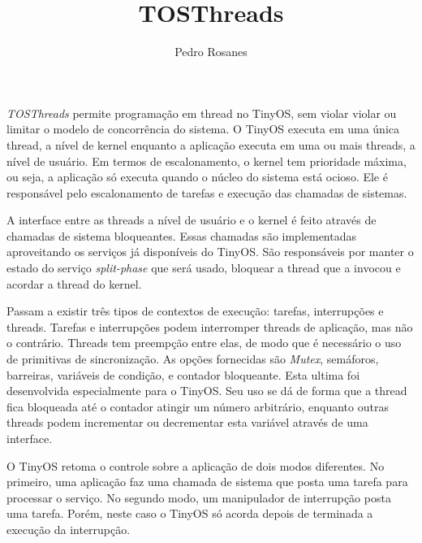\documentclass[a4paper,onecolumn, 10pt]{article}
\title{TOSThreads}
\author{Pedro Rosanes}
\begin{document}
\maketitle





\textit{TOSThreads} permite programação em thread no TinyOS, sem violar violar ou limitar o modelo de concorrência do
sistema. O TinyOS executa em uma única thread, a nível de kernel enquanto a aplicação executa em uma ou mais threads, a nível de usuário.
Em termos de escalonamento, o kernel tem prioridade máxima, ou seja, a aplicação só executa quando o núcleo do sistema
está ocioso. Ele é responsável pelo escalonamento de tarefas e execução das chamadas de sistemas. 

A interface entre as threads a nível de usuário e o kernel é feito através de chamadas de sistema bloqueantes. Essas
chamadas são implementadas aproveitando os serviços já disponíveis do TinyOS. São responsáveis por manter o estado do serviço 
\textit{split-phase} que será usado, bloquear a thread que a invocou e acordar a thread do kernel.

Passam a existir três tipos de contextos de execução: tarefas, interrupções e threads. Tarefas e interrupções podem
interromper threads de aplicação, mas não o contrário. Threads tem preempção entre elas, de modo que é necessário o uso de primitivas 
de sincronização. As opções fornecidas são \textit{Mutex}, semáforos, barreiras, variáveis de condição, e contador
bloqueante. Esta ultima foi desenvolvida especialmente para o TinyOS. Seu uso se dá de forma que a thread fica bloqueada
até o contador atingir um número arbitrário, enquanto outras threads podem incrementar ou decrementar esta variável
através de uma interface.

O TinyOS retoma o controle sobre a aplicação de dois modos diferentes. No primeiro, uma aplicação faz uma chamada de
sistema que posta uma tarefa para processar o serviço. No segundo modo, um manipulador de interrupção posta uma tarefa.
Porém, neste caso o TinyOS só acorda depois de terminada a execução da interrupção.
\end{document}
